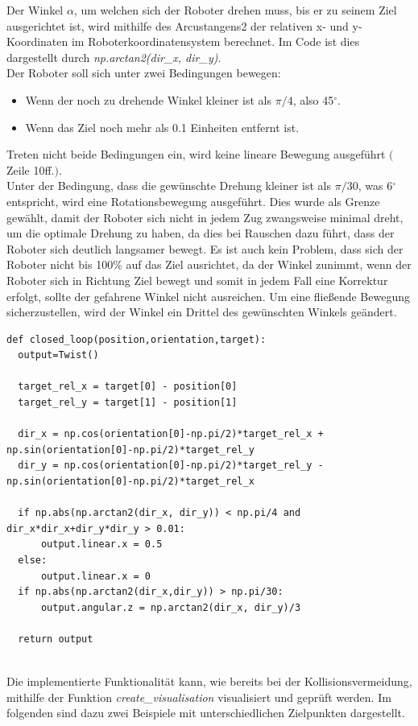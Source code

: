 \documentclass[12pt, a4paper]{report}
\begin{document}
Der Winkel $\alpha$, um welchen sich der Roboter drehen muss, bis er zu seinem Ziel ausgerichtet ist, wird mithilfe des Arcustangens2 der relativen x- und y-Koordinaten im Roboterkoordinatensystem berechnet. Im Code ist dies dargestellt durch \textit{np.arctan2(dir\_x, dir\_y)}.\\
Der Roboter soll sich unter zwei Bedingungen bewegen: 
\begin{itemize}
\item Wenn der noch zu drehende Winkel kleiner ist als $\pi/4$, also 45$^\circ$. 
\item Wenn das Ziel noch mehr als 0.1 Einheiten entfernt ist. 
\end{itemize}
Treten nicht beide Bedingungen ein, wird keine lineare Bewegung ausgeführt $($Zeile 10ff.$)$.\\
Unter der Bedingung, dass die gewünschte Drehung kleiner ist als $\pi/30$, was 6$^\circ$ entspricht, wird eine Rotationsbewegung ausgeführt. Dies wurde als Grenze gewählt, damit der Roboter sich nicht in jedem Zug zwangsweise minimal dreht, um die optimale Drehung zu haben, da dies bei Rauschen dazu führt, dass der Roboter sich deutlich langsamer bewegt. Es ist auch kein Problem, dass sich der Roboter nicht bis 100\% auf das Ziel ausrichtet, da der Winkel zunimmt, wenn der Roboter sich in Richtung Ziel bewegt und somit in jedem Fall eine Korrektur erfolgt, sollte der gefahrene Winkel nicht ausreichen. Um eine fließende Bewegung sicherzustellen, wird der Winkel ein Drittel des gewünschten Winkels geändert.

\begin{lstlisting}
def closed_loop(position,orientation,target):
  output=Twist()

  target_rel_x = target[0] - position[0]
  target_rel_y = target[1] - position[1]

  dir_x = np.cos(orientation[0]-np.pi/2)*target_rel_x + np.sin(orientation[0]-np.pi/2)*target_rel_y
  dir_y = np.cos(orientation[0]-np.pi/2)*target_rel_y - np.sin(orientation[0]-np.pi/2)*target_rel_x

  if np.abs(np.arctan2(dir_x, dir_y)) < np.pi/4 and dir_x*dir_x+dir_y*dir_y > 0.01:
      output.linear.x = 0.5
  else:
      output.linear.x = 0
  if np.abs(np.arctan2(dir_x,dir_y)) > np.pi/30:
      output.angular.z = np.arctan2(dir_x, dir_y)/3

  return output
  
\end{lstlisting}

\newpage
Die implementierte Funktionalität kann, wie bereits bei der Kollisionsvermeidung, mithilfe der Funktion \textit{create\_visualisation} visualisiert und geprüft werden. Im folgenden sind dazu zwei Beispiele mit unterschiedlichen Zielpunkten dargestellt.\newline
\end{document}
